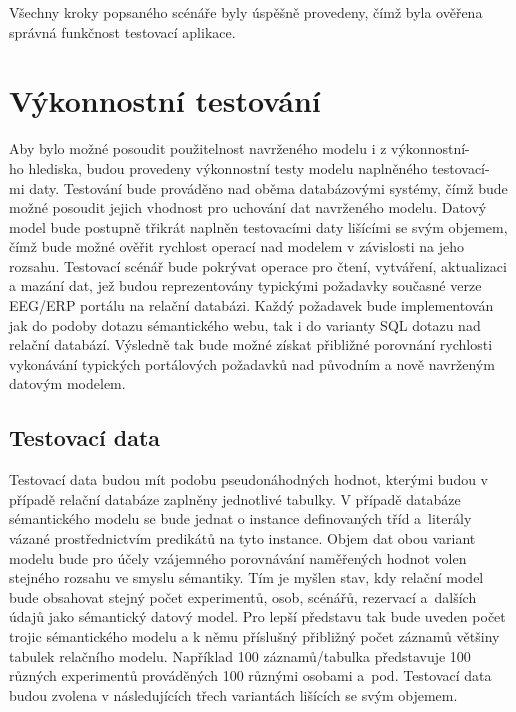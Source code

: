 \documentclass{projekt}
\begin{document}
Všechny kroky popsaného scénáře byly úspěšně provedeny, čímž byla ověřena správná funkčnost testovací aplikace.

\section{Výkonnostní testování}
\hspace{0.65cm}Aby bylo možné posoudit použitelnost navrženého modelu i z výkonnostní-\\ho hlediska, budou provedeny výkonnostní testy modelu naplněného testovací-\\mi daty. Testování bude prováděno nad oběma databázovými systémy, čímž bude možné posoudit jejich vhodnost pro uchování dat navrženého modelu. Datový model bude postupně třikrát naplněn testovacími daty lišícími se svým objemem, čímž bude možné ověřit rychlost operací nad modelem v závislosti na jeho rozsahu. Testovací scénář bude pokrývat operace pro čtení, vytváření, aktualizaci a mazání dat, jež budou reprezentovány typickými požadavky současné verze EEG/ERP portálu na relační databázi. Každý požadavek bude implementován jak do podoby dotazu sémantického webu, tak i do varianty SQL dotazu nad relační databází. Výsledně tak bude možné získat přibližné porovnání rychlosti vykonávání typických portálových požadavků nad původním a nově navrženým datovým modelem.

\subsection{Testovací data}
\hspace{0.65cm}Testovací data budou mít podobu pseudonáhodných hodnot, kterými budou v případě relační databáze zaplněny jednotlivé tabulky. V případě databáze sémantického modelu se bude jednat o instance definovaných tříd a~literály vázané prostřednictvím predikátů na tyto instance. Objem dat obou variant modelu bude pro účely vzájemného porovnávání naměřených hodnot volen stejného rozsahu ve smyslu sémantiky. Tím je myšlen stav, kdy relační model bude obsahovat stejný počet experimentů, osob, scénářů, rezervací a~dalších údajů jako sémantický datový model. Pro lepší představu tak bude uveden počet trojic sémantického modelu a k němu příslušný přibližný počet záznamů většiny tabulek relačního modelu. Například 100 záznamů/tabulka představuje 100 různých experimentů prováděných 100 různými osobami a~pod. Testovací data budou zvolena v následujících třech variantách lišících se svým objemem.
\end{document}
